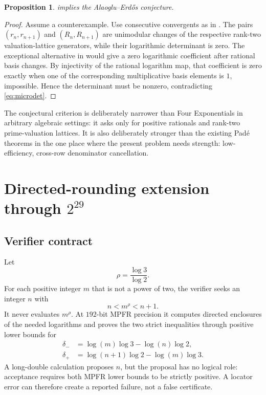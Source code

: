 \documentclass[11pt]{article}
\newtheorem{proposition}[theorem]{Proposition}
\theoremstyle{definition}
\begin{document}
\begin{proposition}\label{prop:mixed-implies}
 implies the Alaoglu--Erd\H{o}s conjecture.
\end{proposition}

\begin{proof}
Assume a counterexample.  Use consecutive convergents as in .  The pairs
$(r_n,r_{n+1})$ and $(R_n,R_{n+1})$ are unimodular changes of the respective rank-two
valuation-lattice generators, while
their logarithmic determinant is zero.  The exceptional alternative in
 would give a zero logarithmic coefficient after rational basis changes.  By
injectivity of the rational logarithm map, that coefficient is zero exactly when one of the
corresponding multiplicative basis elements is $1$, impossible.  Hence the determinant must be
nonzero, contradicting \eqref{eq:microdet}.
\end{proof}

The conjectural criterion is deliberately narrower than Four Exponentials in arbitrary
algebraic settings: it asks only for positive rationals and rank-two prime-valuation
lattices.  It is also deliberately stronger than the existing Pad\'e theorems in the one place
where the present problem needs strength: low-efficiency, cross-row denominator cancellation.

\section{\texorpdfstring{Directed-rounding extension through $2^{29}$}{Directed-rounding extension through 2 power 29}}\label{sec:scan}

\subsection{Verifier contract}

Let
\[
  \rho=\frac{\log3}{\log2}.
\]
For each positive integer $m$ that is not a power of two, the verifier seeks an integer $n$
with
\[
  n<m^\rho<n+1.
\]
It never evaluates $m^\rho$.  At $192$-bit MPFR precision it computes directed enclosures of
the needed logarithms and proves the two strict inequalities through positive lower bounds for
\begin{align}
 \delta_-&=\log(m)\log3-\log(n)\log2,\\
 \delta_+&=\log(n+1)\log2-\log(m)\log3.
\end{align}
A long-double calculation proposes $n$, but the proposal has no logical role: acceptance
requires both MPFR lower bounds to be strictly positive.  A locator error can therefore create
a reported failure, not a false certificate.
\end{document}
